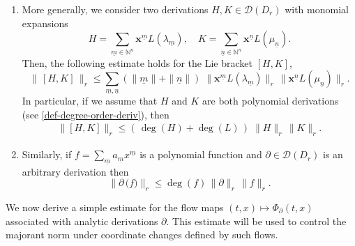 \documentclass[10pt,twoside,reqno]{amsart}
\theoremstyle{remark}
\theoremstyle{remark}
\newcommand{\N}{\mathbb{N}}
\newcommand{\um}{{\underline m}}
\newcommand{\un}{{\underline n}}
\newcommand{\x}{\mathbf{x}}
\newcommand{\cD}{\mathcal{D}}
\begin{document}
\begin{enumerate}
\begin{equation*}
\end{equation*}
       \item More generally, we consider two derivations $H,K \in \cD(D_r)$ with monomial expansions
        $$
        H = \sum_{\um\in \N^n} \x^{\um} L(\lambda_{\um}), \quad
        K = \sum_{\un\in \N^n} \x^{\un} L(\mu_{\un}).
        $$
        Then, the following estimate holds for the Lie bracket $[H,K]$, 
        $$
        \|\, [H,K]\, \|_r \le \sum_{\um,\un} (\|\underline{m}\| + \| \underline{n} \|)\; \|\x ^{\um} L(\lambda_{\um})\|_r \,\|\x ^{\un} L(\mu_{\un})\|_r.
        $$
        In particular, if we assume that $H$ and $K$ are both polynomial derivations (see \eqref{def-degree-order-deriv}), then
		\begin{equation*}
		\begin{split}
			 \| [H, K]  \|_r  \le (\, \deg(H) + \deg(L)\, )\;
			\|  H \|_r\, \|  K \|_r.
		\end{split}
	\end{equation*}   
	\item Similarly, if $f = \sum_{\um} a_\um x^\um$ is a polynomial function and $\partial \in \cD(D_r)$ is an arbitrary derivation then
	\[
	\| \partial\, \big(f)\|_r \le \deg(f)\,  \| \partial \|_r\, \|f\|_r.
	\]
	\end{enumerate}
We now derive a simple estimate for the flow maps $(t,x) \mapsto \Phi_\partial(t,x)$ associated with analytic derivations $\partial$.  This estimate will be used to control the majorant norm under coordinate changes defined by such flows. 
\end{document}
